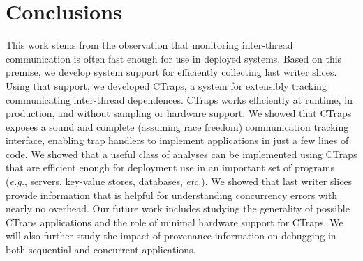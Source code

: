 \documentclass[preprint,9pt]{sigplanconf}
\newcommand{\ctraps}{CTraps\xspace}
\begin{document}
\section{Conclusions}
This work stems from the observation that monitoring inter-thread communication
is often fast enough for use in deployed systems.  Based on this premise, we
develop system support for efficiently collecting last writer slices.  Using
that support, we developed \ctraps, a system for extensibly tracking
communicating inter-thread dependences.  \ctraps works efficiently at runtime,
in production, and without sampling or hardware support.  We showed that
\ctraps exposes a sound and complete (assuming race freedom) communication
tracking interface, enabling trap handlers to implement applications in just a
few lines of code.  We showed that a useful class of analyses can be
implemented using \ctraps that are efficient enough for deployment use in an
important set of programs ({\em e.g.}, servers, key-value stores, databases,
{\em etc.}).  We showed that last writer slices provide information that is
helpful for understanding concurrency errors with nearly no overhead.  Our
future work includes studying the generality of possible \ctraps applications
and the role of minimal hardware support for \ctraps.  We will also further study the
impact of provenance information on debugging in both sequential and concurrent
applications. 




{}

\end{document}
